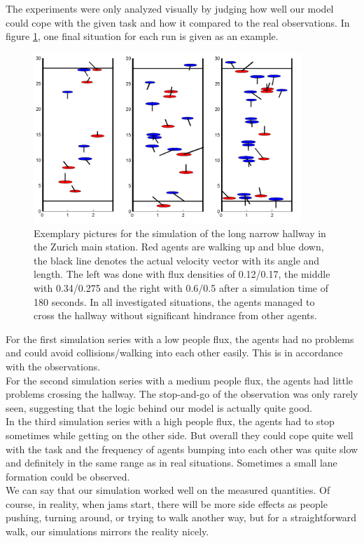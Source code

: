 
\noi The experiments were only analyzed visually by judging how well our model could cope with the given task and how it compared to the real observations. In figure \ref{fig:ex5picture}, one final situation for each run is given as an example.\\

\begin{figure}[h!]
	\centering
		\includegraphics[width=0.90\textwidth]{pictures/ex5picture.png}
	\caption{Exemplary pictures for the simulation of the long narrow hallway in the Zurich main station. Red agents are walking up and blue down, the black line denotes the actual velocity vector with its angle and length. The left was done with flux densities of 0.12/0.17, the middle with 0.34/0.275 and the right with 0.6/0.5 after a simulation time of 180 seconds. In all investigated situations, the agents managed to cross the hallway without significant hindrance from other agents.}
	\label{fig:ex5picture}
\end{figure}

\noi For the first simulation series with a low people flux, the agents had no problems and could avoid collisions/walking into each other easily. This is in accordance with the observations.\\

\noi For the second simulation series with a medium people flux, the agents had little problems crossing the hallway. The stop-and-go of the observation was only rarely seen, suggesting that the logic behind our model is actually quite good.\\

\noi In the third simulation series with a high people flux, the agents had to stop sometimes while getting on the other side. But overall they could cope quite well with the task and the frequency of agents bumping into each other was quite slow and definitely in the same range as in real situations. Sometimes a small lane formation could be observed.\\

\noi We can say that our simulation worked well on the measured quantities. Of course, in reality, when jams start, there will be more side effects as people pushing, turning around, or trying to walk another way, but for a straightforward walk, our simulations mirrors the reality nicely.
